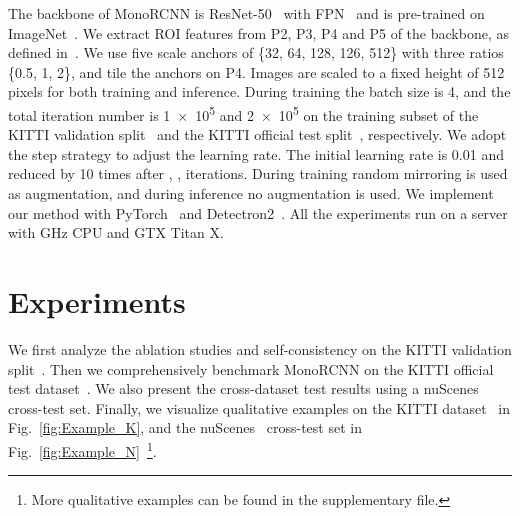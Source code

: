 \documentclass[10pt,twocolumn,letterpaper]{article}
\begin{document}
The backbone of MonoRCNN is ResNet-50~\cite{DBLP:conf/cvpr/HeZRS16} with FPN~\cite{DBLP:conf/cvpr/LinDGHHB17} and is pre-trained on ImageNet~\cite{DBLP:conf/cvpr/DengDSLL009}. We extract ROI features from P2, P3, P4 and P5 of the backbone, as defined in~\cite{DBLP:conf/cvpr/LinDGHHB17}. We use five scale anchors of \{32, 64, 128, 126, 512\} with three ratios \{0.5, 1, 2\}, and tile the anchors on P4. Images are scaled to a fixed height of \num{512} pixels for both training and inference. During training the batch size is \num{4}, and the total iteration number is \num{1e5} and \num{2e5} on the training subset of the KITTI validation split~\cite{DBLP:conf/nips/ChenKZBMFU15} and the KITTI official test split~\cite{DBLP:conf/cvpr/GeigerLU12}, respectively. We adopt the step strategy to adjust the learning rate. The initial learning rate is \num{0.01} and reduced by \num{10} times after , ,  iterations. During training random mirroring is used as augmentation, and during inference no augmentation is used. We implement our method with PyTorch~\cite{DBLP:conf/nips/PaszkeGMLBCKLGA19} and Detectron2~\cite{wu2019detectron2}. All the experiments run on a server with  GHz CPU and GTX Titan X. \section{Experiments}

We first analyze the ablation studies and self-consistency on the KITTI validation split~\cite{DBLP:conf/nips/ChenKZBMFU15}. Then we comprehensively benchmark MonoRCNN on the KITTI official test dataset~\cite{DBLP:conf/cvpr/GeigerLU12}. We also present the cross-dataset test results using a nuScenes~\cite{DBLP:conf/cvpr/CaesarBLVLXKPBB20} cross-test set. Finally, we visualize qualitative examples on the KITTI dataset~\cite{DBLP:conf/cvpr/GeigerLU12} in Fig.~\ref{fig:Example_K}, and the nuScenes~\cite{DBLP:conf/cvpr/CaesarBLVLXKPBB20} cross-test set in Fig.~\ref{fig:Example_N}~\footnote{More qualitative examples can be found in the supplementary file.}.
\end{document}
